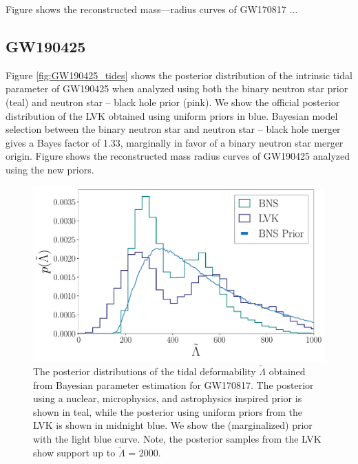 \documentclass[twocolumn]{aastex631}
\begin{document}
	Figure  shows the reconstructed mass---radius curves of GW170817 ... 
	\subsection{GW190425}
	Figure \ref{fig:GW190425_tides} shows the posterior distribution of the intrinsic tidal parameter of GW190425 when analyzed using both the binary neutron star prior (teal) and neutron star -- black hole prior (pink). We show the official posterior distribution  of the LVK obtained using uniform priors in blue. 
	Bayesian model selection between the binary neutron star and neutron star -- black hole merger gives a Bayes factor of 1.33, marginally in favor of a binary neutron star merger origin. 
	Figure  shows the reconstructed mass radius curves of GW190425 analyzed using the new priors.  
	\begin{figure}
		\centering
		\includegraphics[width=1.\linewidth]{Fig_2_GW170817_lambda_tilde_posteriors_BNS.pdf}
		\caption{The posterior distributions of the tidal deformability $\tilde{\Lambda}$ obtained from Bayesian parameter estimation for GW170817. The posterior using a nuclear, microphysics, and astrophysics inspired prior is shown in teal, while the posterior using uniform priors from the LVK is shown in midnight blue. We show the (marginalized) prior with the light blue curve. Note, the posterior samples from the LVK show support up to $\tilde{\Lambda}$ = 2000. }
		\label{fig:GW170817_tides}
	\end{figure}
	
\end{document}
